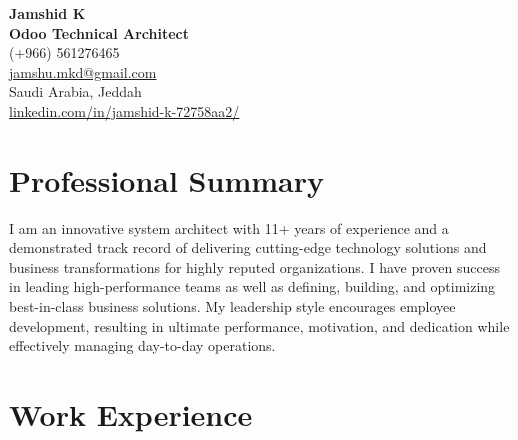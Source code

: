 \documentclass[a4paper,10pt]{article}
\begin{document}
\begin{center}
    {\Huge \textbf{Jamshid K}} \\
    \vspace{2mm}
    \textcolor{primary}{\Large \textbf{ Odoo Technical Architect}} \\
    \vspace{2mm}
    (+966) 561276465 \\
    \href{mailto:jamshu.mkd@gmail.com}{jamshu.mkd@gmail.com} \\
    Saudi Arabia, Jeddah \\
    \href{https://www.linkedin.com/in/jamshid-k-72758aa2/}{linkedin.com/in/jamshid-k-72758aa2/}
\end{center}

\vspace{5mm}

\section*{\textcolor{primary}{Professional Summary}}
\noindent I am an innovative system architect with 11+ years of experience and a demonstrated track record of delivering cutting-edge technology solutions and business transformations for highly reputed organizations. I have proven success in leading high-performance teams as well as defining, building, and optimizing best-in-class business solutions. My leadership style encourages employee development, resulting in ultimate performance, motivation, and dedication while effectively managing day-to-day operations.

\vspace{5mm}

\section*{\textcolor{primary}{Work Experience}}
\end{document}
